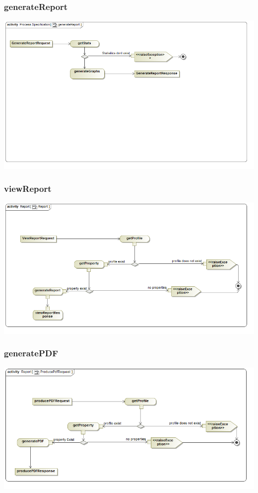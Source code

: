 \documentclass[a4paper,12pt]{article}
\begin{document}
\subsubsection{generateReport}
\includegraphics[width=1\textwidth]{./Images/processSpecification/generateReport.png}
\subsubsection{viewReport}
\includegraphics[width=1\textwidth]{./Images/newDiagrams/processSpecification/Sandile/viewReport.png}
\subsubsection{generatePDF}
\includegraphics[width=1\textwidth]{./Images/newDiagrams/processSpecification/Sandile/ProducePdfRequest.png}
\end{document}
